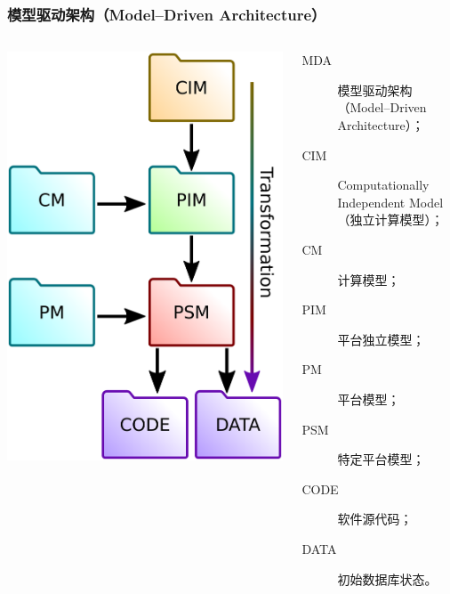 \documentclass[10pt]{beamer}
\begin{document}
\begin{frame}[fragile]
  \frametitle{模型驱动架构（Model--Driven Architecture）}
  \begin{columns}
    \begin{column}{0.4\textwidth}
      \includegraphics[width=1\linewidth]{mda-most-general.pdf}
    \end{column}
    \begin{column}{0.7\linewidth}
      \begin{description}
      \item[MDA] 模型驱动架构（Model--Driven Architecture）；
      \item[CIM] Computationally Independent Model（独立计算模型）；
      \item[CM] 计算模型；
      \item[PIM] 平台独立模型；
      \item[PM] 平台模型；
      \item[PSM] 特定平台模型；
      \item[CODE] 软件源代码；
      \item[DATA] 初始数据库状态。
      \end{description}
    \end{column}
  \end{columns}
\end{frame}
\end{document}
